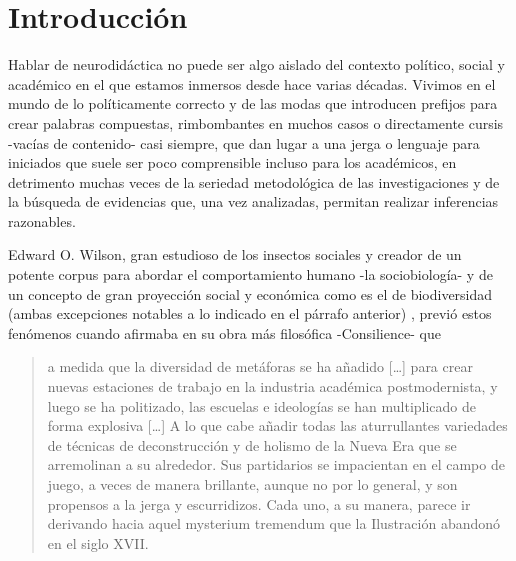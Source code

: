 \documentclass[spanish]{textolivre}
\begin{document}
\begin{polyabstract}
\begin{english}
\begin{abstract}
\end{abstract}
\end{english}
\end{polyabstract}

\section{Introducción}\label{sec-intro}
Hablar de neurodidáctica no puede ser algo aislado del contexto político, social y académico en el que estamos inmersos desde hace varias décadas. Vivimos en el mundo de lo políticamente correcto y de las modas que introducen prefijos para crear palabras compuestas, rimbombantes en muchos casos o directamente cursis -vacías de contenido- casi siempre, que dan lugar a una jerga o lenguaje para iniciados que suele ser poco comprensible incluso para los académicos, en detrimento muchas veces de la seriedad metodológica de las investigaciones y de la búsqueda de evidencias que, una vez analizadas, permitan realizar inferencias razonables.

Edward O. Wilson, gran estudioso de los insectos sociales y creador de un potente corpus para abordar el comportamiento humano -la sociobiología- y de un concepto de gran proyección social y económica como es el de biodiversidad (ambas excepciones notables a lo indicado en el párrafo anterior) \cite{wilson1999unity,wilson2000sociobiology},%
previó estos fenómenos cuando afirmaba en su obra más filosófica -Consilience- \cite[p.~54--65]{wilson1999unity} %
que

\begin{quote}
    a medida que la diversidad de metáforas se ha añadido […] para crear nuevas estaciones de trabajo en la industria académica postmodernista, y luego se ha politizado, las escuelas e ideologías se han multiplicado de forma explosiva […] A lo que cabe añadir todas las aturrullantes variedades de técnicas de deconstrucción y de holismo de la Nueva Era que se arremolinan a su alrededor. Sus partidarios se impacientan en el campo de juego, a veces de manera brillante, aunque no por lo general, y son propensos a la jerga y escurridizos. Cada uno, a su manera, parece ir derivando hacia aquel mysterium tremendum que la Ilustración abandonó en el siglo XVII.
\end{quote}
\end{document}
